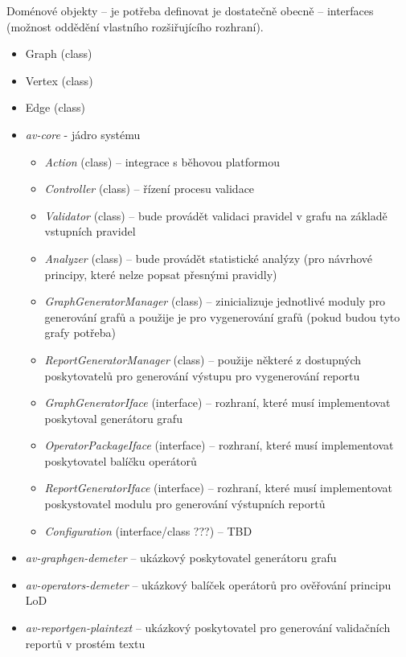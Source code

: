 Doménové objekty -- je potřeba definovat je dostatečně obecně -- interfaces (možnost oddědění vlastního rozšiřujícího rozhraní).

\begin{itemize}
\item Graph (class)
\item Vertex (class)
\item Edge (class)
\end{itemize}

\begin{itemize}
\item \emph{av-core} - jádro systému
  \begin{itemize}
  \item \emph{Action} (class) -- integrace s běhovou platformou
  \item \emph{Controller} (class) -- řízení procesu validace
  \item \emph{Validator} (class) -- bude provádět validaci pravidel v grafu na základě vstupních pravidel
  \item \emph{Analyzer} (class) -- bude provádět statistické analýzy (pro návrhové principy, které nelze popsat přesnými pravidly)
  \item \emph{GraphGeneratorManager} (class) -- zinicializuje jednotlivé moduly pro generování grafů a použije je pro vygenerování grafů (pokud budou tyto grafy potřeba)
  \item \emph{ReportGeneratorManager} (class) -- použije některé z dostupných poskytovatelů pro generování výstupu pro vygenerování reportu
  \item \emph{GraphGeneratorIface} (interface) -- rozhraní, které musí implementovat poskytoval generátoru grafu
  \item \emph{OperatorPackageIface} (interface) -- rozhraní, které musí implementovat poskytovatel balíčku operátorů
  \item \emph{ReportGeneratorIface} (interface) -- rozhraní, které musí implementovat poskystovatel modulu pro generování výstupních reportů
  \item \emph{Configuration} (interface/class ???) --  TBD
  \end{itemize}
\item \emph{av-graphgen-demeter} -- ukázkový poskytovatel generátoru grafu
\item \emph{av-operators-demeter} -- ukázkový balíček operátorů pro ověřování principu LoD
\item \emph{av-reportgen-plaintext} -- ukázkový poskytovatel pro generování validačních reportů v prostém textu
\end{itemize}

